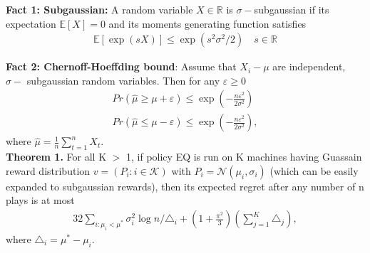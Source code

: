 \documentclass{article}
\begin{document}
\begin{enumerate}
\begin{enumerate}
    \textbf{Fact 1: Subgaussian:} A random variable $X \in \mathbb{R}$ is $\sigma-$subgaussian if its expectation $\mathbb{E}[X] = 0$ and its moments generating function satisfies  
    \begin{align}
        \mathbb{E}[\exp (s X)] \leq \exp (s^2\sigma^2/2) \quad  s \in \mathbb{R}
    \end{align}
    
    \textbf{Fact 2: Chernoff-Hoeffding bound}: Assume that $X_i - \mu$ are independent, $\sigma-$ subgaussian random variables. Then for any $\varepsilon \geq 0$ 
    \begin{align}
        Pr(\hat{\mu} \geq \mu + \varepsilon) \leq \exp(-\frac{n\varepsilon^2}{2\sigma^2})\\
        Pr(\hat{\mu} \leq \mu - \varepsilon) \leq \exp(-\frac{n\varepsilon^2}{2\sigma^2}),
    \end{align}
    where $\hat{\mu} = \frac{1}{n}\sum_{t=1}^n X_t$.\\
    
    \textbf{Theorem 1.} For all K $>$ 1, if policy EQ is run on K machines having Guassain reward distribution $v = (P_i: i \in \mathcal{K})$ with $P_i = \mathcal{N}(\mu_i, \sigma_i)$ (which can be easily expanded to subgaussian rewards), then its expected regret after any number of n plays is at most 
    \begin{align}
        32 \sum_{i: \mu_i < \mu^\ast} \sigma_i^2 \log n /\triangle_i + (1 + \frac{\pi^2}{3})(\sum_{j=1}^K \triangle_j),
    \end{align}
    where $\triangle_i = \mu^\ast - \mu_i$.\\
    

\end{enumerate}
\end{enumerate}
\end{document}
